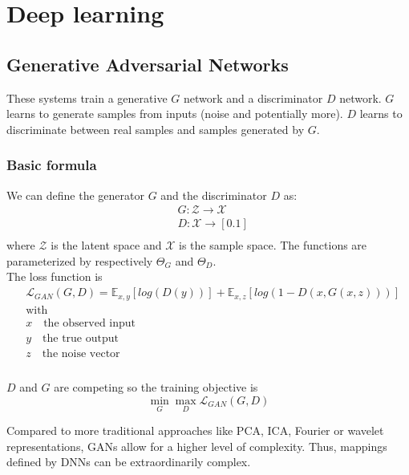 \documentclass[../main.tex]{subfiles}
\begin{document}
\chapter{Deep learning}

\section{Generative Adversarial Networks}
These systems train a generative $G$ network and a discriminator $D$ network. $G$ learns to generate
samples from inputs (noise and potentially more). $D$ learns to discriminate between real samples and
samples generated by $G$.

\subsection{Basic formula}
We can define the generator $G$ and the discriminator $D$ as:
\begin{align*}
    &G: \mathcal{Z} \to \mathcal{X} \\
    &D: \mathcal{X} \to [0. 1] \\
\end{align*}
where $\mathcal{Z}$ is the latent space and $\mathcal{X}$ is the sample space. The functions are
parameterized by respectively $\Theta_G$ and $\Theta_D$. \\
The loss function is
\begin{align*}
    &\mathcal{L}_{GAN}(G, D) = \mathbb{E}_{x,y}[log(D(y))] + \mathbb{E}_{x,z}[log(1-D(x, G(x, z)))] \\
    &\text{with} \\
    & x\quad \text{the observed input} \\
    & y\quad \text{the true output} \\
    & z\quad \text{the noise vector} \\
\end{align*} \\
$D$ and $G$ are competing so the training objective is
\begin{equation}
    \min_G \max_D \mathcal{L}_{GAN}(G, D)
\end{equation}

Compared to more traditional approaches like PCA, ICA, Fourier or wavelet representations, GANs allow
for a higher level of complexity. Thus, mappings defined by DNNs can be extraordinarily complex.
\end{document}

